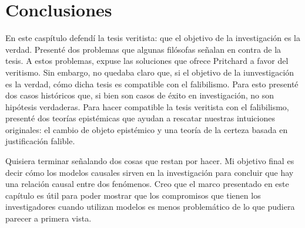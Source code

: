 \documentclass{article}
\begin{document}
\section{Conclusiones}

En este caspítulo defendí la tesis veritista: que el objetivo de la investigación es la verdad. Presenté dos problemas que algunas filósofas señalan en contra de la tesis. A estos problemas, expuse las soluciones que ofrece Pritchard a favor del veritismo. Sin embargo, no quedaba claro que, si el objetivo de la iunvestigación es la verdad, cómo dicha tesis es compatible con el falibilismo. Para esto presenté dos casos históricos que, si bien son casos de éxito en investigación, no son hipótesis verdaderas. Para hacer compatible la tesis veritista con el falibilismo, presenté dos teorías epistémicas que ayudan a rescatar nuestras intuiciones originales: el cambio de objeto epistémico y una teoría de la certeza basada en justificación falible.

Quisiera terminar señalando dos cosas que restan por hacer. Mi objetivo final es decir cómo los modelos causales sirven en la investigación para concluir que hay una relación causal entre dos fenómenos. Creo que el marco presentado en este capítulo es útil para poder mostrar que los compromisos que tienen los investigadores cuando utilizan modelos es menos problemático de lo que pudiera parecer a primera vista.



\end{document}
